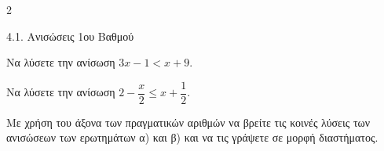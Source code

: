\begin{ylh}{2}
    \item 4.1. Ανισώσεις 1ου Βαθμού
\end{ylh}

\begin{alist}
\item Να λύσετε την ανίσωση $3x - 1 < x + 9$.
\item Να λύσετε την ανίσωση $2 - \dfrac{x}{2} \le x + \dfrac{1}{2}$.
\item Με χρήση του άξονα των πραγματικών αριθμών να βρείτε τις κοινές λύσεις των ανισώσεων των ερωτημάτων α) και β) και να τις γράψετε σε μορφή διαστήματος.
\end{alist}

